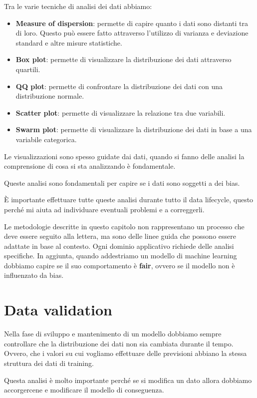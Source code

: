 Tra le varie tecniche di analisi dei dati abbiamo:
\begin{itemize}
    \item \textbf{Measure of dispersion}: permette di capire quanto i dati sono
          distanti tra di loro. Questo può essere fatto attraverso l'utilizzo
          di varianza e deviazione standard e altre misure statistiche.
    \item \textbf{Box plot}: permette di visualizzare la distribuzione dei dati
          attraverso quartili.
    \item \textbf{QQ plot}: permette di confrontare la distribuzione dei dati
          con una distribuzione normale.
    \item \textbf{Scatter plot}: permette di visualizzare la relazione tra due
          variabili.
    \item \textbf{Swarm plot}: permette di visualizzare la distribuzione dei dati
          in base a una variabile categorica.
\end{itemize}
Le visualizzazioni sono spesso guidate dai dati, quando si fanno delle analisi
la comprensione di cosa si sta analizzando è fondamentale.

Queste analisi sono fondamentali per capire se i dati sono soggetti a dei bias.

È importante effettuare tutte queste analisi durante tutto il data lifecycle,
questo perché mi aiuta ad individuare eventuali problemi e a correggerli.

Le metodologie descritte in questo capitolo non rappresentano un processo che deve
essere seguito alla lettera, ma sono delle linee guida che possono essere adattate
in base al contesto. Ogni dominio applicativo richiede delle analisi specifiche.
In aggiunta, quando addestriamo un modello di machine learning dobbiamo capire se
il suo comportamento è \textbf{fair}, ovvero se il modello non è influenzato da
bias.
\section{Data validation}
Nella fase di sviluppo e mantenimento di un modello dobbiamo sempre controllare
che la distribuzione dei dati non sia cambiata durante il tempo.
Ovvero, che i valori su cui vogliamo effettuare delle previsioni abbiano la stessa
struttura dei dati di training.

Questa analisi è molto importante perché se si modifica un dato allora dobbiamo
accorgercene e modificare il modello di conseguenza.

